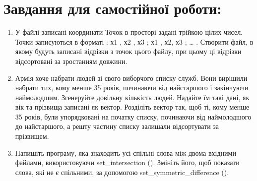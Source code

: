 \documentclass[a5paper,titlepage,openany,twoside,draft]{book_unv}%
\begin{document}
\section{Завдання для самостійної роботи:}

\begin{enumerate}
\def\labelenumi{\arabic{enumi})}
\setcounter{enumi}{9}
\item
  У файлі записані координати Точок в просторі задані трійкою цілих
  чисел. Точки записуються в форматі : х1 , х2 , х3 ; х1 , х2, х3 ;
  \ldots{} . Створити файл, в якому будуть записані відрізки з точок цього файлу, при
цьому ці відрізки відсортовані за зростанням довжини.

\item
  Армія хоче набрати людей зі свого виборчого списку служб. Вони
  вирішили набрати тих, кому менше 35 років, починаючи
  від найстаршого і закінчуючи наймолодшим. Згенеруйте довільну кількість
  людей. Надайте їм такі дані, як вік та прізвища записані як вектор.
  Розділіть вектор так, щоб ті, кому менше 35 років, були
  упорядковані на початку списку, починаючи від наймолодшого до
  найстаршого, а решту частину списку залишали відсортувати за прізвищем.

\item
  Напишіть програму, яка знаходить усі спільні слова між двома вхідними
  файлами, використовуючи set\_intersection (). Змініть його, щоб
  показати слова, які не є спільними, за допомогою
  set\_symmetric\_difference ().


\end{enumerate}
\end{document}
